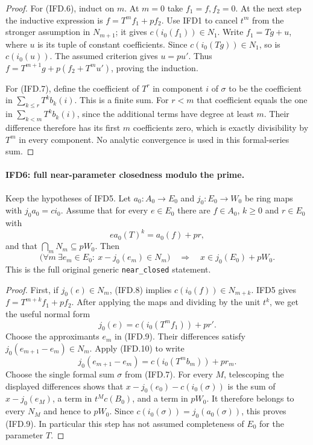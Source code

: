 \begin{proof}
For (IFD.6), induct on $m$. At $m=0$ take $f_1=f,f_2=0$.
At the next step the inductive expression is $f=T^mf_1+pf_2$.
Use IFD1 to cancel $t^m$ from the stronger assumption in $N_{m+1}$;
it gives $c(i_0(f_1))\in N_1$. Write $f_1=Tg+u$, where $u$ is
its tuple of constant coefficients. Since $c(i_0(Tg))\in N_1$,
so is $c(i_0(u))$. The assumed criterion gives $u=pu'$.
Thus $f=T^{m+1}g+p(f_2+T^mu')$, proving the induction.

For (IFD.7), define the coefficient of $T^r$ in component $i$ of
$\sigma$ to be the coefficient in $\sum_{k\leq r}T^kb_k(i)$.
This is a finite sum. For $r<m$ that coefficient equals the one in
$\sum_{k<m}T^kb_k(i)$, since the additional terms have degree at
least $m$. Their difference therefore has its first $m$ coefficients
zero, which is exactly divisibility by $T^m$ in every component.
No analytic convergence is used in this formal-series sum.
\end{proof}

\paragraph{IFD6: full near-parameter closedness modulo the prime.}
\label{claim:IFD6}
Keep the hypotheses of IFD5. Let $a_0:A_0\to E_0$ and
$j_0:E_0\to W_0$ be ring maps with $j_0a_0=ci_0$.
Assume that for every $e\in E_0$ there are $f\in A_0$, $k\geq0$
and $r\in E_0$ with
\[
                     e a_0(T)^k=a_0(f)+pr,                 \tag{IFD.8}
\]
and that $\bigcap_mN_m\subseteq pW_0$. Then
\[
 \bigl(\forall m\ \exists e_m\in E_0:\ x-j_0(e_m)\in N_m\bigr)
          \quad\Longrightarrow\quad x\in j_0(E_0)+pW_0.    \tag{IFD.9}
\]
This is the full original generic \texttt{near\_closed} statement.

\begin{proof}
First, if $j_0(e)\in N_m$, (IFD.8) implies
$c(i_0(f))\in N_{m+k}$. IFD5 gives
$f=T^{m+k}f_1+pf_2$. After applying the maps and dividing by the
unit $t^k$, we get the useful normal form
\[
                     j_0(e)=c(i_0(T^mf_1))+pr'.             \tag{IFD.10}
\]
Choose the approximants $e_m$ in (IFD.9). Their differences satisfy
$j_0(e_{m+1}-e_m)\in N_m$. Apply (IFD.10) to write
\[
                     j_0(e_{m+1}-e_m)=c(i_0(T^mb_m))+pr_m.
\]
Choose the single formal sum $\sigma$ from (IFD.7).
For every $M$, telescoping the displayed differences shows that
$x-j_0(e_0)-c(i_0(\sigma))$ is the sum of $x-j_0(e_M)$,
a term in $t^Mc(B_0)$, and a term in $pW_0$.
It therefore belongs to every $N_M$ and hence to $pW_0$.
Since $c(i_0(\sigma))=j_0(a_0(\sigma))$, this proves (IFD.9).
In particular this step has not assumed completeness of $E_0$
for the parameter $T$.
\end{proof}

